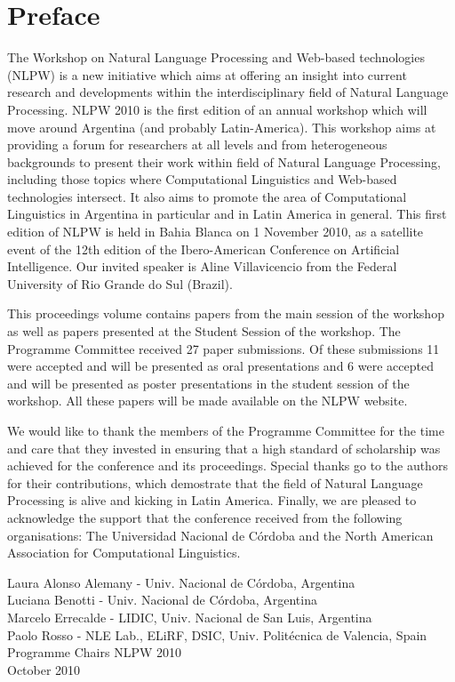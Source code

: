 \documentclass{llncs}
\begin{document}
%
\frontmatter          %
%
\pagestyle{headings}  %
\addtocmark{ } %
%
\chapter*{Preface}
%
The Workshop on Natural Language Processing and Web-based technologies (NLPW) 
is a new initiative which aims at offering an insight into current research and 
developments within the interdisciplinary field of Natural Language Processing. 
NLPW 2010 is the first edition of an annual workshop which will move around 
Argentina (and probably Latin-America). This workshop aims at providing a forum 
for researchers at all levels and from heterogeneous backgrounds to present 
their work within field of Natural Language Processing, including those topics 
where Computational Linguistics and Web-based technologies intersect. It also 
aims to promote the area of Computational Linguistics in Argentina in 
particular and in Latin America in general.
This first edition of NLPW is held in Bahia Blanca on 1 November 2010, as a 
satellite event of the 12th edition of the Ibero-American Conference on 
Artificial Intelligence. Our invited speaker is Aline Villavicencio from the 
Federal University of Rio Grande do Sul (Brazil). 

This proceedings volume contains papers from the main session of the workshop 
as well as papers presented at the Student Session of the workshop. 
The Programme Committee received 27 paper submissions. Of these submissions 11 
were accepted and will be presented as oral presentations and 6 were 
accepted and will be presented as poster presentations in the student session
of the workshop. All these papers will be made available on the NLPW website. 
 
We would like to thank the members of the Programme Committee for the time and 
care that they invested in ensuring that
a high standard of scholarship was achieved for the conference and its 
proceedings. Special thanks go to the authors for their contributions,
which demostrate that the field of Natural Language Processing is alive and 
kicking in Latin America. Finally, we are pleased
to acknowledge the support that the conference received from the following 
organisations: The Universidad Nacional de C\'ordoba and the North American Association
for Computational Linguistics. 

\vspace{1cm}
\begin{flushright}\noindent
\begin{it}
Laura Alonso Alemany - Univ. Nacional de C\'ordoba, Argentina \\
Luciana Benotti - Univ. Nacional de C\'ordoba, Argentina \\
Marcelo Errecalde - LIDIC, Univ. Nacional de San Luis, Argentina \\
Paolo Rosso - NLE Lab., ELiRF, DSIC, Univ. Polit\'ecnica de Valencia, Spain \\
Programme Chairs NLPW 2010 \\
October 2010
\end{it}
\end{flushright}
\end{document}
